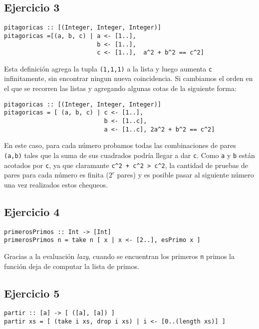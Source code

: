 \documentclass[10pt,a4paper]{article}
\begin{document}
\subsection{Ejercicio 3}
\begin{centrado}
\begin{verbatim}
pitagoricas :: [(Integer, Integer, Integer)]
pitagoricas =[(a, b, c) | a <- [1..], 
                          b <- [1..], 
                          c <- [1..],  a^2 + b^2 == c^2]
\end{verbatim}
\end{centrado}

Esta definición agrega la tupla \texttt{(1,1,1)} a la lista y luego aumenta \texttt{c} infinitamente, sin encontrar ningun nueva coincidencia. Si cambiamos el orden en el que se recorren las listas y agregando algunas cotas de la siguiente forma:
\begin{centrado}
\begin{verbatim}
pitagoricas :: [(Integer, Integer, Integer)]
pitagoricas = [ (a, b, c) | c <- [1..], 
                            b <- [1..c],
                            a <- [1..c], 2a^2 + b^2 == c^2]
\end{verbatim}
\end{centrado}
En este caso, para cada número probamos todas las combinaciones de pares \texttt{(a,b)} tales que la suma de sus cuadrados podría llegar a dar \texttt{c}. Como \texttt{a} y \texttt{b} están acotados por \texttt{c}, ya que claramante \texttt{c^2 + c^2 > c^2}, la cantidad de pruebas de pares para cada número es finita ($2^c$ pares) y es posible pasar al siguiente número una vez realizados estos chequeos.


\subsection{Ejercicio 4}
\begin{centrado}
\begin{verbatim}
primerosPrimos :: Int -> [Int]
primerosPrimos n = take n [ x | x <- [2..], esPrimo x ]
\end{verbatim}
\end{centrado}

Gracias a la evaluación \textit{lazy}, cuando se encuentran los primeros \texttt{n} primos la función deja de computar la lista de primos.

\subsection{Ejercicio 5}
\begin{centrado}
	\begin{verbatim}
partir :: [a] -> [ ([a], [a]) ]
partir xs = [ (take i xs, drop i xs) | i <- [0..(length xs)] ]
	\end{verbatim}
\end{centrado}
\end{document}
